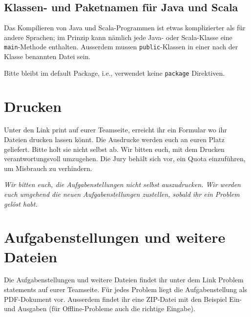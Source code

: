 \subsection[Klassennamen für Java und Scala]{Klassen- und Paketnamen für Java und Scala}
Das Kompilieren von Java und Scala-Programmen ist etwas komplizierter als für andere
Sprachen; im Prinzip kann nämlich jede Java- oder Scala-Klasse eine \texttt{main}-Methode
enthalten. Ausserdem mussen \texttt{public}-Klassen in einer nach
der Klasse benannten Datei sein.

Bitte bleibt im default Package, i.e., verwendet keine \texttt{package} Direktiven.

\section{Drucken}
Unter den Link \glqq{} print \grqq{} auf eurer Teamseite,
erreicht ihr ein Formular wo ihr Dateien drucken lassen könnt.
Die Ausdrucke werden euch an euren Platz geliefert. Bitte holt sie nicht selbst
ab. Wir bitten euch, mit dem Drucken verantwortungsvoll umzugehen. Die Jury
behält sich vor, ein Quota einzuführen, um Misbrauch zu verhindern.

\emph{Wir bitten euch, die Aufgabenstellungen nicht selbst auszudrucken. Wir
werden euch umgehend die neuen Aufgabenstellungen zustellen, sobald ihr ein
Problem gelöst habt.}

\section{Aufgabenstellungen und weitere Dateien}
Die Aufgabenstellungen und weitere Dateien findet ihr unter dem Link \glqq
Problem statements\grqq{} auf eurer Teamseite. Für jedes Problem liegt die
Aufgabenstellung als PDF-Dokument vor. Ausserdem findet ihr eine ZIP-Datei mit
den Beispiel Ein- und Ausgaben (für Offline-Probleme auch die richtige Eingabe).

